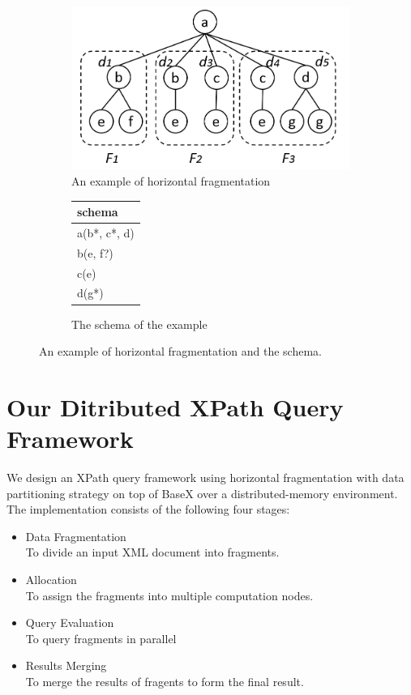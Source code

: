 \begin{figure}[t]
	\centering
	\begin{subfigure}{.6\textwidth}
		\centering
		\includegraphics[width=.99\linewidth]{figures/hfrag_example}
		\caption{An example of horizontal fragmentation}
		\label{fig:sub1}
	\end{subfigure}%
	\begin{subfigure}{.4\textwidth}
		\centering
		\vspace{12mm}
		\begin{tabular}{|l|}
			\hline
			schema\\
			\hline
			a(b*, c*, d) \\
			b(e, f?) \\
			c(e) \\
			d(g*) \\
			\hline
		\end{tabular}
		\vspace{12mm}
		\caption{The schema of the example}
		\label{fig:sub2}
	\end{subfigure}
	\caption{An example of horizontal fragmentation and the schema.}
	\label{fig:hfrag_example}
\end{figure}



\section{Our Ditributed XPath Query Framework}

We design an XPath query framework using horizontal fragmentation with data
partitioning strategy on top of BaseX over a distributed-memory environment. 
The implementation consists of the following four stages:\\
\begin{itemize}
	\item Data Fragmentation \\To divide an input XML document into fragments.
	\item Allocation\\ To assign the fragments into multiple computation nodes.
	\item Query Evaluation\\ To query fragments in parallel
	\item Results Merging\\ To merge the results of fragents to form the final result.
\end{itemize}

